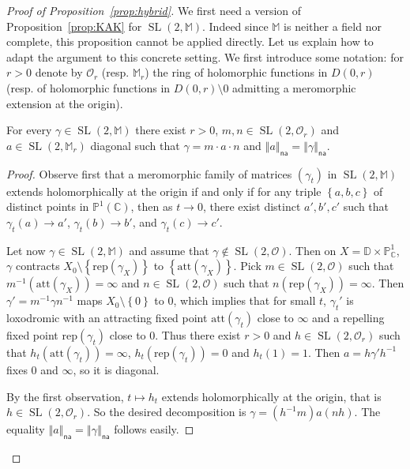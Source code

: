 \documentclass[AHL,Unicode,longabstracts]{cedram}
\DeclareMathOperator{\SL}{SL}
\newcommand{\cc}{\mathbb{C}}
\newcommand{\dD}{\mathbb{D}}
\newcommand{\mm}{\mathbb{M}}
\newcommand{\set}[1]{\left\{#1\right\}}
\newcommand{\norm}[1]{\left\Vert#1\right\Vert}
\newcommand{\pu}{{\mathbb{P}^1}}
\newcommand{\PP}{\mathbb{P}}
\newcommand{\att}{\mathrm{att}}
\newcommand{\rep}{\mathrm{rep}}
\newcommand{\na}{\mathsf{na}}
\newcommand{\inv}{^{-1}}
\begin{document}
\begin{proof}[Proof of Proposition~\ref{prop:hybrid}]
We first need a version of Proposition~\ref{prop:KAK} for $\SL(2, \mm)$. Indeed since $\mm$ is neither a field nor complete, this proposition cannot be applied directly. Let us explain how to adapt the argument to this concrete setting. We first introduce some notation: for $r>0$ denote by $\mathcal{O}_r$ (resp. $\mm_r$) the ring of holomorphic functions in $D(0, r)$ (resp. of holomorphic functions in $D(0, r)\setminus {0}$ admitting a meromorphic extension at the origin).

\begin{lemm}\label{lem:KAK holomorphe}
For every $\gamma\in \SL(2, \mm)$ there exist $r>0$, $m,n \in \SL(2,\mathcal{O}_r)$ and $a \in \SL(2, \mm_r)$ diagonal such that $\gamma= m\cdot a \cdot n$ and $\norm{a}_\na = \norm{\gamma}_\na$.
\end{lemm}

\begin{proof}
Observe first that a meromorphic family of matrices $(\gamma_t)$ in $\SL(2, \mm)$ extends holomorphically at the origin if and only if for any triple $\set{a,b,c}$ of distinct points in $\pu(\cc)$, then as $t\to 0$, there exist distinct $a',b',c'$ such that $\gamma_t(a)\to a'$, $\gamma_t(b)\to b'$, and $\gamma_t(c)\to c'$.

Let now $\gamma\in \SL(2, \mm)$ and assume that $\gamma\notin\SL(2, \mathcal{O})$. Then on $X = \dD\times \PP^1_\cc$, $\gamma$ contracts $X_0\setminus\set{\rep(\gamma_X)}$ to $\set{\att(\gamma_X)}$. Pick $m\in \SL(2, \mathcal{O})$ such that $m\inv(\att(\gamma_X)) = \infty$ and $n\in \SL(2, \mathcal{O})$ such that $n(\rep(\gamma_X)) = \infty$. Then $\gamma' = m\inv\gamma n\inv$ maps $X_0\setminus\set{0}$ to $0$, which implies that for small $t$, $\gamma_t'$ is loxodromic with an attracting fixed point $\att(\gamma_t)$ close to $\infty$ and a repelling fixed point $\rep(\gamma_t)$ close to $0$. Thus there exist $r>0$ and $h\in \SL(2, \mathcal{O}_r)$ such that $h_t(\att(\gamma_t)) =\infty$, $h_t(\rep(\gamma_t)) = 0$ and $h_t(1) =1$. Then $a= h\gamma'h^{-1}$ fixes 0 and $\infty$, so it is diagonal.

By the first observation, $t\mapsto h_t$ extends holomorphically at the origin, that is $h\in \SL(2, \mathcal{O}_r)$. So the desired decomposition is $\gamma = (h\inv m) a (n h)$. The equality $\norm{a}_\na = \norm{\gamma}_\na$ follows easily.
\end{proof}


\end{proof}
\end{document}
